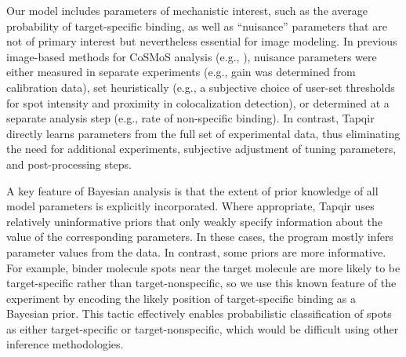 Our model includes parameters of mechanistic interest, such as the average probability of target-specific binding, as well as ``nuisance'' parameters that are not of primary interest but nevertheless essential for image modeling. In previous image-based methods for CoSMoS analysis (e.g., \cite{Friedman2015-nx,Smith2019-yb}), nuisance parameters were either measured in separate experiments (e.g., gain was determined from calibration data), set heuristically (e.g., a subjective choice of user-set thresholds for spot intensity and proximity in colocalization detection), or determined at a separate analysis step (e.g., rate of non-specific binding). In contrast, Tapqir directly learns parameters from the full set of experimental data, thus eliminating the need for additional experiments, subjective adjustment of tuning parameters, and post-processing steps.

A key feature of Bayesian analysis is that the extent of prior knowledge of all model parameters is explicitly incorporated. Where appropriate, Tapqir uses relatively uninformative priors that only weakly specify information about the value of the corresponding parameters.  In these cases, the program mostly infers parameter values from the data.  In contrast, some priors are more informative.  For example, binder molecule spots near the target molecule are more likely to be target-specific rather than target-nonspecific, so we use this known feature of the experiment by encoding the likely position of target-specific binding as a Bayesian prior. This tactic effectively enables probabilistic classification of spots as either target-specific or target-nonspecific, which would be difficult using other inference methodologies.

